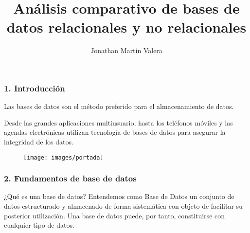 \documentclass{beamer}
\title[Análisis de las bases de datos actuales] {Análisis comparativo de bases de datos relacionales y no relacionales }
\author{Jonathan Martín Valera}
\begin{document}
\justifying

\begin{frame}
	\titlepage
\end{frame}



\begin{frame}	
	\frametitle{1. Introducción}
	
	Las bases de datos son el método preferido para el almacenamiento de datos.
	
	\vspace{0.3cm}
	
	Desde las grandes aplicaciones multiusuario, hasta los teléfonos móviles y las agendas electrónicas
	utilizan tecnología de bases de datos para asegurar la integridad de los datos.
	
	\begin{figure}[!h]
		\centering
		\texttt{[image: images/portada]}
	\end{figure}
	
\end{frame}	



\begin{frame}

	\frametitle{2. Fundamentos de base de datos}
	
	\begin{block}{¿Qué es una base de datos?}
		Entendemos como Base de Datos un conjunto de datos estructurado y almacenado de
		forma sistemática con objeto de facilitar su posterior utilización. Una base de datos puede,
		por tanto, constituirse con cualquier tipo de datos.
	\end{block}
	
	
\end{frame}
\end{document}
